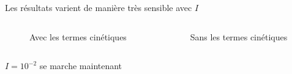 \documentclass[10pt]{beamer}
\begin{document}
\begin{frame}{Les résultats varient de manière très sensible avec $I$}
    \begin{columns}
        \begin{column}{0.5\textwidth}
            \begin{figure}[h]
                \centering
                \scalebox{0.5}{}
                \caption{Avec les termes cinétiques}
            \end{figure}
        \end{column}
        \begin{column}{0.5\textwidth}
            \begin{figure}[h]
                \centering
                \scalebox{0.5}{}
                \caption{Sans les termes cinétiques}
            \end{figure}
        \end{column}
    \end{columns}
    $I = 10^{-2}$ se marche maintenant
\end{frame}
\end{document}

